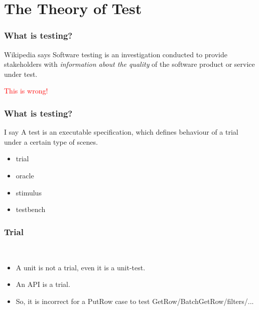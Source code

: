 \documentclass[lualatex]{beamer}
\begin{document}
\section{The Theory of Test}

\begin{frame}
  \frametitle{What is testing?}

  \begin{block}{Wikipedia says}
    Software testing is an investigation conducted to provide stakeholders with \emph{information about the quality} of the software product or service under test.
  \end{block}
  \pause
  \begin{center}
    \Huge
    \textcolor{red}{This is wrong!}
  \end{center}
\end{frame}

\begin{frame}
  \frametitle{What is testing?}
  
  \begin{block}{I say}
    A test is an executable specification, which defines behaviour of a trial under a certain type of scenes.
    \begin{itemize}
    \item trial
    \item oracle
    \item stimulus
    \item testbench
    \end{itemize}
  \end{block}
\end{frame}

\begin{frame}
  \frametitle{Trial}

  \begin{block}{~}
    \begin{itemize}
    \item A unit is not a trial, even it is a unit-test.
    \item An API is a trial.
    \item So, it is incorrect for a PutRow case to test GetRow/BatchGetRow/filters/...
    \end{itemize}
  \end{block}
\end{frame}
\end{document}

